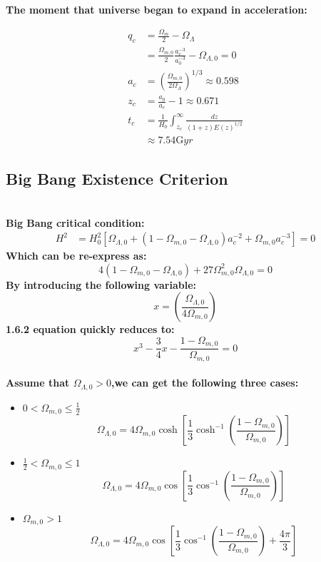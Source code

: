 \documentclass[14pt]{article}
\begin{document}
\textbf{The moment that universe began to expand in acceleration:}

\begin{align*}
    q_{c}&=\frac{\Omega_{m}}{2}-\Omega_{\Lambda}\\
    &=\frac{\Omega_{m,0}}{2}\frac{a^{-3}_{c}}{a^{-3}_{0}}-\Omega_{\Lambda,0}=0\tag{1.5.6}\\
    a_{c}&=\displaystyle(\frac{\Omega_{m,0}}{2\Omega_{\Lambda}})^{1/3} \approx 0.598 \tag{1.5.7}\\
    z_{c}&=\frac{a_{0}}{a_{c}}-1\approx 0.671 \tag{1.5.8}\\
     t_{c}&=\frac{1}{H_{0}}\int^{\infty}_{z_{c}}\displaystyle\frac{dz}{(1+z)E(z)^{1/2}}\\
      &\approx 7.54 \mathrm{G} yr\tag{1.5.9}
\end{align*}
\subsection{Big Bang Existence Criterion\cite{GRAIfPh1}}
\quad\\
\textbf{Big Bang critical condition:}
\begin{align*}
H^{2}&=H^{2}_{0}[\Omega_{\Lambda,0}+(1-\Omega_{m,0}-\Omega_{\Lambda,0})a^{-2}_{c}+\Omega_{m,0}a^{-3}_{c}]=0\tag{1.6.1}
\end{align*}
\textbf{Which can be re-express as:}
\[
4(1-\Omega_{m,0}-\Omega_{\Lambda,0})+27\Omega_{m,0}^{2}\Omega_{\Lambda,0}=0\tag{1.6.2}
\]
\textbf{By introducing the following variable:}
\[
x=\displaystyle(\frac{\Omega_{\Lambda,0}}{4\Omega_{m,0}})\tag{1.6.3}
\]
\textbf{1.6.2 equation quickly reduces to:}
\[
x^{3}-\frac{3}{4}x-\frac{1-\Omega_{m,0}}{\Omega_{m,0}}=0\tag{1.6.4}
\]
\quad\\
\textbf{Assume that $\Omega_{\Lambda,0}>0$,we can get the following three cases:}

\begin{itemize}
    \item $0<\Omega_{m,0}\le \displaystyle\frac{1}{2}$\\
    \[\Omega_{\Lambda,0}=4\Omega_{m,0}\cosh[\frac{1}{3}\cosh^{-1}(\frac{1-\Omega_{m,0}}{\Omega_{m,0}})]\tag{1.6.5}\]
    \item $\displaystyle\frac{1}{2}<\Omega_{m,0}\le 1$\\
     \[\Omega_{\Lambda,0}=4\Omega_{m,0}\cos[\frac{1}{3}\cos^{-1}(\frac{1-\Omega_{m,0}}{\Omega_{m,0}})]\tag{1.6.6}\]
    \item $\Omega_{m,0}> 1$\\
    \[\Omega_{\Lambda,0}=4\Omega_{m,0}\cos[\frac{1}{3}\cos^{-1}(\frac{1-\Omega_{m,0}}{\Omega_{m,0}})+\frac{4\pi}{3}]\tag{1.6.7}\]
\end{itemize}
\end{document}

